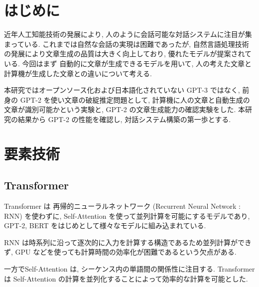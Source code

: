 \documentclass[twocolumn]{jarticle}     %
\begin{document}


\section{はじめに}


近年人工知能技術の発展により,
人のように会話可能な対話システムに注目が集まっている.
これまでは自然な会話の実現は困難であったが, 自然言語処理技術の発展により文章生成の品質は大きく向上しており, 優れたモデルが提案されている.
今回はまず
自動的に文章が生成できるモデルを用いて,
人の考えた文章と計算機が生成した文章との違いについて考える.


本研究ではオープンソース化および日本語化されていない GPT-3 ではなく,
前身の GPT-2 \cite{radford2019language} を使い文章の破綻推定問題として,
計算機に人の文章と自動生成の文章が識別可能かという実験と,
GPT-2 の文章生成能力の確認実験をした.
本研究の結果から GPT-2 の性能を確認し,
対話システム構築の第一歩とする.

\section{要素技術}
\subsection{Transformer}
Transformer は
再帰的ニューラルネットワーク (Recurrent Neural Network : RNN)
を使わずに, Self-Attention を使って並列計算を可能にするモデルであり, GPT-2, BERT \cite{devlin2018bert} をはじめとして様々なモデルに組み込まれている.

RNN は時系列に沿って逐次的に入力を計算する構造であるため並列計算ができず,
GPU などを使っても計算時間の効率化が困難であるという欠点がある.

一方でSelf-Attention は, シーケンス内の単語間の関係性に注目する.
Transformer \cite{DBLP:journals/corr/VaswaniSPUJGKP17} は Self-Attention の計算を並列化することによって効率的な計算を可能とした.
\end{document}
